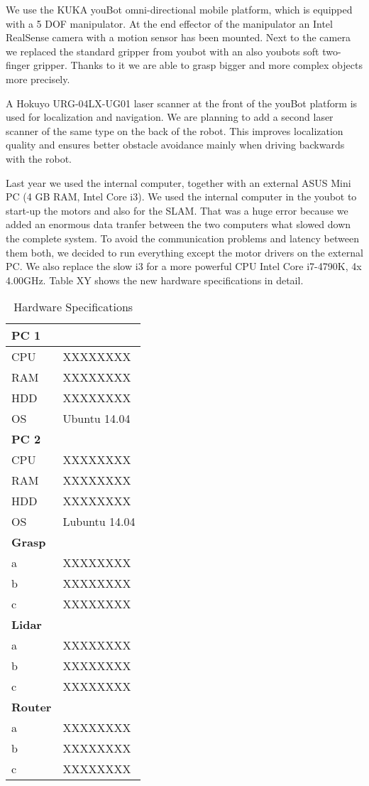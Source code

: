 We use the KUKA youBot omni-directional mobile platform, which is equipped with a 5 DOF manipulator. At the end effector of the manipulator an Intel RealSense camera with a motion sensor has been mounted. Next to the camera we replaced the standard gripper from youbot with an also youbots soft two-finger gripper. Thanks to it we are able to grasp bigger and more complex objects more precisely.

A Hokuyo URG-04LX-UG01 laser scanner at the front of the youBot platform is used for localization and navigation. We are planning to add a second laser scanner of the same type on the back of the robot. This improves localization quality and ensures better obstacle avoidance mainly when driving backwards with the robot.

Last year we used the internal computer, together with an external ASUS Mini PC (4 GB RAM, Intel Core i3). We used the internal computer in the youbot to start-up the motors and also for the SLAM. That was a huge error because we added an enormous data tranfer between the two computers what slowed down the complete system. To avoid the communication problems and latency between them both, we decided to run everything except the motor drivers on the external PC. We also replace the slow i3 for a more powerful CPU Intel Core i7-4790K, 4x 4.00GHz. Table XY  shows the new hardware specifications in detail. 

\begin{table}[h]
	\caption{Hardware Specifications}
	\centering
	\begin{tabular}{ | p{2cm} | p{3cm} | }
		\hline
		\bfseries{PC 1} &  \\
		\hline
		CPU & XXXXXXXX \\
		RAM & XXXXXXXX \\
		HDD & XXXXXXXX \\
		OS & Ubuntu 14.04 \\
		\hline \hline
		\bfseries{PC 2} &  \\
		\hline
		CPU & XXXXXXXX \\
		RAM & XXXXXXXX \\
		HDD & XXXXXXXX \\
		OS & Lubuntu 14.04 \\
		\hline \hline
		\bfseries{Grasp} &  \\
		\hline
		a & XXXXXXXX \\
		b & XXXXXXXX \\
		c & XXXXXXXX \\
		\hline \hline
		\bfseries{Lidar} &  \\
		\hline
		a & XXXXXXXX \\
		b & XXXXXXXX \\
		c & XXXXXXXX \\
		\hline \hline
		\bfseries{Router} &  \\
		\hline
		a & XXXXXXXX \\
		b & XXXXXXXX \\
		c & XXXXXXXX \\
		\hline
	\end{tabular}
	\label{tab:hw}
\end{table}

